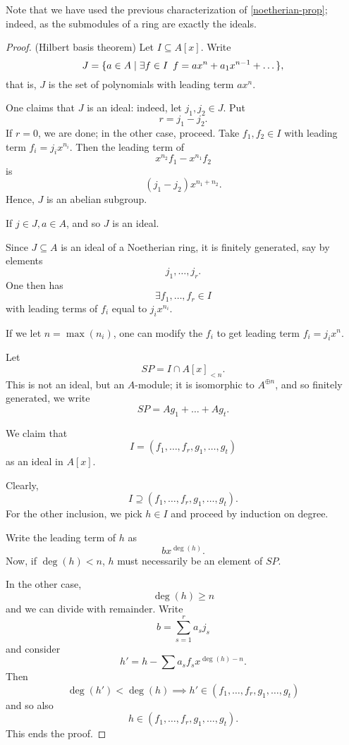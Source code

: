 Note that we have used the previous characterization of \cref{noetherian-prop}; indeed, as the submodules of a ring are exactly the ideals.

\begin{proof} (Hilbert basis theorem)
  Let $I \subseteq A[x]$. Write
  \[ J = \{ a \in A \mathrel{|} \exists f \in I \enspace f = ax^n + a_1 x^{n-1} + \dotso \},\]
  that is, $J$ is the set of polynomials with leading term $ax^n$.

  One claims that $J$ is an ideal: indeed, let $j_1, j_2 \in J$. Put
  \[ r = j_1 - j_2.\]
  If $r=0$, we are done; in the other case, proceed.
  Take $f_1, f_2 \in I$ with leading term $f_i = j_i x^{n_i}$.
  Then the leading term of
  \[ x^{n_2} f_1 - x^{n_1} f_2\]
  is
  \[(j_1 - j_2) x^{n_1+n_2}.\]
  Hence, $J$ is an abelian subgroup.

  If $j \in J, a \in A$,
  and so $J$ is an ideal.

  Since $J \subseteq A$ is an ideal of a Noetherian ring, it is finitely generated, say by elements
  \[ j_1, \dotsc, j_r.\]
  One then has
  \[ \exists f_1, \dotsc, f_r \in I\]
  with leading terms of $f_i$ equal to $j_i x^{n_i}$.

  If we let $n = \max(n_i)$, one can modify the $f_i$ to get leading term $f_i = j_i x^n$.

  Let
  \[ SP = I \cap A[x]_{< n}.\]
  This is not an ideal, but an $A$-module; it is isomorphic to $A^{\oplus n}$, and so finitely generated, we write
  \[ SP = Ag_1 + \dotso + Ag_t.\]

  We claim that
  \[ I = (f_1, \dotsc, f_r, g_1, \dotsc, g_t)\]
  as an ideal in $A[x]$.

  Clearly,
  \[ I \supseteq (f_1, \dotsc, f_r, g_1, \dotsc, g_t).\]
  For the other inclusion, we pick $h \in I$ and proceed by induction on degree.

  Write the leading term of $h$ as
  \[ b x^{\deg(h)}.\]
  Now, if $\deg(h) < n$, $h$ must necessarily be an element of $SP$.

  In the other case,
  \[ \deg(h) \geq n\]
  and we can divide with remainder. Write
  \[ b = \sum_{s=1}^r a_s j_s\]
  and consider
  \[ h' = h - \sum a_s f_s x^{\deg(h)-n}.\]
  Then
  \[ \deg(h') < \deg(h) \implies h' \in (f_1, \dotsc, f_r, g_1, \dotsc, g_t)\]
  and so also
  \[ h \in (f_1, \dotsc, f_r, g_1, \dotsc, g_t).\]
  This ends the proof.
\end{proof}


